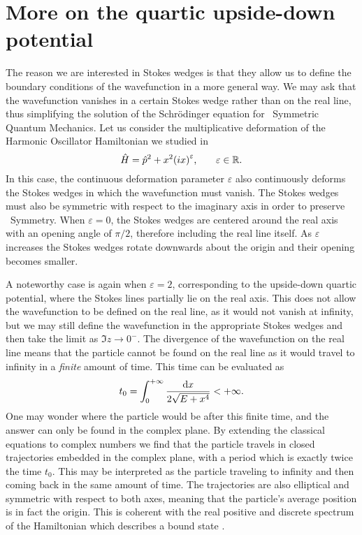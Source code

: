     \section*{More on the quartic upside-down potential}
        The reason we are interested in Stokes wedges is that they allow us to define the boundary conditions of the wavefunction in a more general way. We may ask that the wavefunction vanishes in a certain Stokes wedge rather than on the real line, thus simplifying the solution of the Schr\"odinger equation for \PT\ Symmetric Quantum Mechanics. Let us consider the multiplicative deformation of the Harmonic Oscillator Hamiltonian we studied in 
        \begin{equation*}
            \hH = \hp^2 + x^2\pqty{i x}^\varepsilon
            \mycomma \qquad
            \varepsilon \in \bbR 
            \myperiod
        \end{equation*}
        In this case, the continuous deformation parameter $\varepsilon$ also continuously deforms the Stokes wedges in which the wavefunction must vanish. The Stokes wedges must also be symmetric with respect to the imaginary axis in order to preserve \PT\ Symmetry. When $\varepsilon = 0$, the Stokes wedges are centered around the real axis with an opening angle of $\pi/2$, therefore including the real line itself. As $\varepsilon$ increases the Stokes wedges rotate downwards about the origin and their opening becomes smaller.

        A noteworthy case is again when $\varepsilon = 2$, corresponding to the upside-down quartic potential, where the Stokes lines partially lie on the real axis. This does not allow the wavefunction to be defined on the real line, as it would not vanish at infinity, but we may still define the wavefunction in the appropriate Stokes wedges and then take the limit as $\Im z \to 0^-$. The divergence of the wavefunction on the real line means that the particle cannot be found on the real line as it would travel to infinity in a \emph{finite} amount of time. This time can be evaluated as
        \begin{equation*}
            t_0 = \int_{0}^{+\infty} \frac{\dd{x}}{2\sqrt{E + x^4}} < +\infty
            \text{.}
        \end{equation*}
        One may wonder where the particle would be after this finite time, and the answer can only be found in the complex plane. By extending the classical equations to complex numbers we find that the particle travels in closed trajectories embedded in the complex plane, with a period which is exactly twice the time $t_0$. This may be interpreted as the particle traveling to infinity and then coming back in the same amount of time. The trajectories are also elliptical and symmetric with respect to both axes, meaning that the particle's average position is in fact the origin. This is coherent with the real positive and discrete spectrum of the Hamiltonian which describes a bound state \cite{bender2024}.